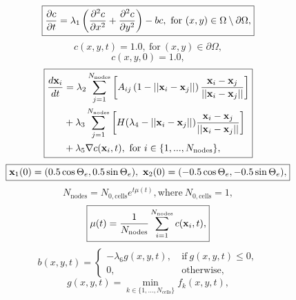\begin{equation} \label{eqn:EOMs_PDE}
    \boxed{\pdv{c}{t} = \lambda_1 \left(\pdv[2]{c}{x} + \pdv[2]{c}{y} \right) - bc,
     \ \textrm{for} \ (x,y) \in \Omega \setminus \partial \Omega,}
\end{equation}
\begin{equation}
    \boxed{c(x,y,t) = 1.0, \ \textrm{for} \ (x,y) \in \partial \Omega,}
\end{equation}
\begin{equation}
    \boxed{c(x,y,0) = 1.0,}
\end{equation}
\begin{equation}\label{eqn:EOMs_ODE}
    \boxed{
    \begin{split}
        \frac{d \vb{x}_i}{d t} 
         &= \lambda_2 \sum_{j=1}^{N_{\textrm{nodes}}} \left[ A_{ij}\left( 1- ||\vb{x}_i - \vb{x}_j|| \right) \frac{\vb{x}_i - \vb{x}_j}{||\vb{x}_i - \vb{x}_j||} \right]\\
         &+ \lambda_3 \sum_{j=1}^{N_{\textrm{nodes}}} \left[H(\lambda_4 - ||\vb{x}_i - \vb{x}_j||) \frac{\vb{x}_i - \vb{x}_j}{||\vb{x}_i - \vb{x}_j||}     \right]\\ 
         &+ \lambda_5 \nabla c (\vb{x}_i, t), \ \textrm{for} \ i \in \{ 1, ...,N_{\textrm{nodes}} \},  
    \end{split}}
\end{equation}
\begin{equation}
    \boxed{\vb{x}_1(0) = (0.5 \cos{\Theta_e}, 0.5 \sin{\Theta_e}), \ \vb{x}_2(0) = (-0.5 \cos{\Theta_e}, -0.5 \sin{\Theta_e}), }
\end{equation}
\begin{equation} \label{eqn:expGrowth}
    \boxed{N_{\textrm{nodes}} = N_{0, \textrm{cells}} e^{t \mu(t)}, \textrm{where} \ N_{0, \textrm{cells}} = 1, }
\end{equation}
\begin{equation}\label{eqn:growthRate}
    \boxed{\mu(t) = \frac{1}{N_{\textrm{nodes}}}\sum_{i=1}^{N_{\textrm{nodes}}} c(\vb{x}_i, t), } 
\end{equation}
\begin{equation} \label{eqn:biomass}
    \boxed{
    b(x,y,t) = 
    \begin{cases}
        -\lambda_6 g(x,y,t), & \ \textrm{if} \ g(x,y,t) \leq 0, \\
            0, &    \ \textrm{otherwise},
    \end{cases}
    }
\end{equation}
\begin{equation}
    \boxed{
    g(x,y,t) = \min_{k \in \{  1, ..., N_{\textrm{cells}}\}} f_k (x,y,t),
    }
\end{equation}
